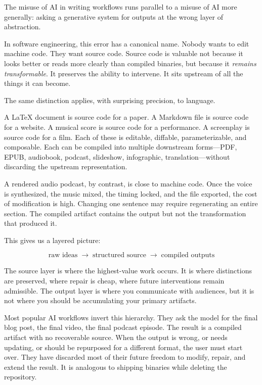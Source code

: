 \documentclass[12pt]{article}
\begin{document}
The misuse of AI in writing workflows runs parallel to a misuse of AI more generally: asking a generative system for outputs at the wrong layer of abstraction.

In software engineering, this error has a canonical name. Nobody wants to edit machine code. They want source code. Source code is valuable not because it looks better or reads more clearly than compiled binaries, but because it \emph{remains transformable}. It preserves the ability to intervene. It sits upstream of all the things it can become.

The same distinction applies, with surprising precision, to language.

A \LaTeX{} document is source code for a paper. A Markdown file is source code for a website. A musical score is source code for a performance. A screenplay is source code for a film. Each of these is editable, diffable, parameterizable, and composable. Each can be compiled into multiple downstream forms---PDF, EPUB, audiobook, podcast, slideshow, infographic, translation---without discarding the upstream representation.

A rendered audio podcast, by contrast, is close to machine code. Once the voice is synthesized, the music mixed, the timing locked, and the file exported, the cost of modification is high. Changing one sentence may require regenerating an entire section. The compiled artifact contains the output but not the transformation that produced it.

This gives us a layered picture:

\[
\text{raw ideas} \;\longrightarrow\; \text{structured source} \;\longrightarrow\; \text{compiled outputs}
\]

The source layer is where the highest-value work occurs. It is where distinctions are preserved, where repair is cheap, where future interventions remain admissible. The output layer is where you communicate with audiences, but it is not where you should be accumulating your primary artifacts.

Most popular AI workflows invert this hierarchy. They ask the model for the final blog post, the final video, the final podcast episode. The result is a compiled artifact with no recoverable source. When the output is wrong, or needs updating, or should be repurposed for a different format, the user must start over. They have discarded most of their future freedom to modify, repair, and extend the result. It is analogous to shipping binaries while deleting the repository.
\end{document}
